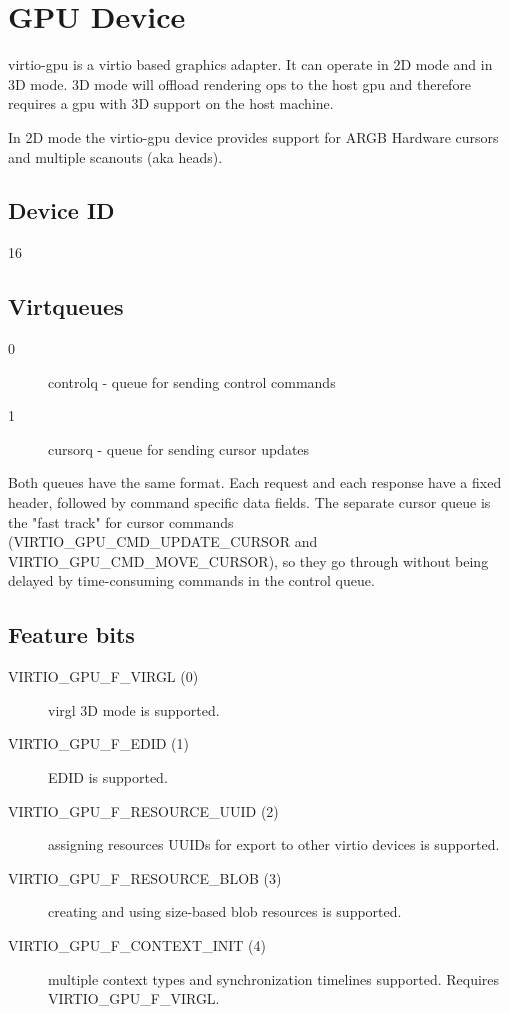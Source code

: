 \section{GPU Device}\label{sec:Device Types / GPU Device}

virtio-gpu is a virtio based graphics adapter.  It can operate in 2D
mode and in 3D mode.  3D mode will offload rendering ops to
the host gpu and therefore requires a gpu with 3D support on the host
machine.

In 2D mode the virtio-gpu device provides support for ARGB Hardware
cursors and multiple scanouts (aka heads).

\subsection{Device ID}\label{sec:Device Types / GPU Device / Device ID}

16

\subsection{Virtqueues}\label{sec:Device Types / GPU Device / Virtqueues}

\begin{description}
\item[0] controlq - queue for sending control commands
\item[1] cursorq - queue for sending cursor updates
\end{description}

Both queues have the same format.  Each request and each response have
a fixed header, followed by command specific data fields.  The
separate cursor queue is the "fast track" for cursor commands
(VIRTIO_GPU_CMD_UPDATE_CURSOR and VIRTIO_GPU_CMD_MOVE_CURSOR), so they
go through without being delayed by time-consuming commands in the
control queue.

\subsection{Feature bits}\label{sec:Device Types / GPU Device / Feature bits}

\begin{description}
\item[VIRTIO_GPU_F_VIRGL (0)] virgl 3D mode is supported.
\item[VIRTIO_GPU_F_EDID  (1)] EDID is supported.
\item[VIRTIO_GPU_F_RESOURCE_UUID (2)] assigning resources UUIDs for export
  to other virtio devices is supported.
\item[VIRTIO_GPU_F_RESOURCE_BLOB (3)] creating and using size-based blob
  resources is supported.
\item[VIRTIO_GPU_F_CONTEXT_INIT (4)] multiple context types and
  synchronization timelines supported.  Requires VIRTIO_GPU_F_VIRGL.
\end{description}

